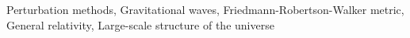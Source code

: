 \documentclass[twocolumn]{aastex631}
\begin{document}
Perturbation methods, Gravitational waves, Friedmann-Robertson-Walker metric, General relativity, Large-scale structure of the universe
\end{document}
